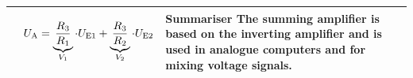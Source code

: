 \begin{table}[ht]
\begin{tabular}{|m{}|m{}|m{}|}
    

\centering


    &
    \begin{center}
    
\end{center}
\vspace{1ex}
\[
\begin{aligned}
    U_{\textnormal{A}} = \underbrace{\frac{R_3} {R_1}}_{V_1} \cdot U_{\textnormal{E1}} + \underbrace{\frac{R_3} {R_2}}_{V_2} \cdot U_{\textnormal{E2}}
\end{aligned}
\]
    & 
    \textbf{Summariser}\newline
    The summing amplifier is based on the inverting amplifier and is used in analogue computers and for mixing voltage signals.
    \\ %
    \hline
    
    \end{tabular}
\end{table}


\newpage













